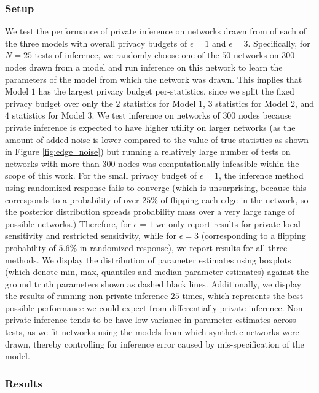  \subsubsection{Setup}
 
 We test the performance of private inference on networks drawn from of each of the three models with overall privacy budgets of $\epsilon=1$ and $\epsilon=3$. Specifically, for $N=25$ tests of inference, we randomly choose one of the $50$ networks on $300$ nodes drawn from a model and run inference on this network to learn the parameters of the model from which the network was drawn. This implies that Model $1$ has the largest privacy budget per-statistics, since we split the fixed privacy budget over only the $2$ statistics for Model $1$, $3$ statistics for Model $2$, and $4$ statistics for Model $3$. We test inference on networks of $300$ nodes because private inference is expected to have higher utility on larger networks (as the amount of added noise is lower compared to the value of true statistics as shown in Figure \ref{fig:edge_noise}) but running a relatively large number of tests on networks with more than $300$ nodes was computationally infeasible within the scope of this work. For the small privacy budget of $\epsilon=1$, the inference method using randomized response fails to converge (which is unsurprising, because this corresponds to a probability of over $25\%$ of flipping each edge in the network, so the posterior distribution spreads probability mass over a very large range of possible networks.) Therefore, for $\epsilon=1$ we only report results for private local sensitivity and restricted sensitivity, while for $\epsilon = 3$ (corresponding to a flipping probability of $5.6\%$ in randomized response), we report results for all three methods. We display the distribution of parameter estimates using boxplots (which denote min, max, quantiles and median parameter estimates) against the ground truth parameters shown as dashed black lines. Additionally, we display the results of running non-private inference $25$ times, which represents the best possible performance we could expect from differentially private inference. Non-private inference tends to be have low variance in parameter estimates across tests, as we fit networks using the models from which synthetic networks were drawn, thereby controlling for inference error caused by mis-specification of the model.
 
 \subsubsection{Results}
 

